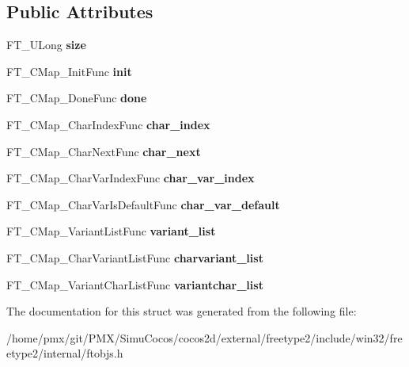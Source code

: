 \subsection*{Public Attributes}
\begin{DoxyCompactItemize}
\item 
\mbox{\label{structFT__CMap__ClassRec___a86283cf239b9c0e559c9acbaa004def6}} 
F\+T\+\_\+\+U\+Long {\bfseries size}
\item 
\mbox{\label{structFT__CMap__ClassRec___afe1da0877ec0686dfe7b2e020fc0d408}} 
F\+T\+\_\+\+C\+Map\+\_\+\+Init\+Func {\bfseries init}
\item 
\mbox{\label{structFT__CMap__ClassRec___a00d1d77a4d926340b4d97bc03cd29231}} 
F\+T\+\_\+\+C\+Map\+\_\+\+Done\+Func {\bfseries done}
\item 
\mbox{\label{structFT__CMap__ClassRec___ad1c0448188e8d52f6159b5521bb2dc83}} 
F\+T\+\_\+\+C\+Map\+\_\+\+Char\+Index\+Func {\bfseries char\+\_\+index}
\item 
\mbox{\label{structFT__CMap__ClassRec___a053362f31fcfbc6a284cc8d026ab57ff}} 
F\+T\+\_\+\+C\+Map\+\_\+\+Char\+Next\+Func {\bfseries char\+\_\+next}
\item 
\mbox{\label{structFT__CMap__ClassRec___a6bc46e2595aec30295e6d2bfc362afcb}} 
F\+T\+\_\+\+C\+Map\+\_\+\+Char\+Var\+Index\+Func {\bfseries char\+\_\+var\+\_\+index}
\item 
\mbox{\label{structFT__CMap__ClassRec___ac8305cb0aebd02b54c0046765f28ef4a}} 
F\+T\+\_\+\+C\+Map\+\_\+\+Char\+Var\+Is\+Default\+Func {\bfseries char\+\_\+var\+\_\+default}
\item 
\mbox{\label{structFT__CMap__ClassRec___ad61635444cbfc71c4259e74cb892c172}} 
F\+T\+\_\+\+C\+Map\+\_\+\+Variant\+List\+Func {\bfseries variant\+\_\+list}
\item 
\mbox{\label{structFT__CMap__ClassRec___a65db9dfa0e29b7de257dc8870532ab19}} 
F\+T\+\_\+\+C\+Map\+\_\+\+Char\+Variant\+List\+Func {\bfseries charvariant\+\_\+list}
\item 
\mbox{\label{structFT__CMap__ClassRec___ac1563590a0bac99082aa0996b94aad57}} 
F\+T\+\_\+\+C\+Map\+\_\+\+Variant\+Char\+List\+Func {\bfseries variantchar\+\_\+list}
\end{DoxyCompactItemize}


The documentation for this struct was generated from the following file\+:\begin{DoxyCompactItemize}
\item 
/home/pmx/git/\+P\+M\+X/\+Simu\+Cocos/cocos2d/external/freetype2/include/win32/freetype2/internal/ftobjs.\+h\end{DoxyCompactItemize}

